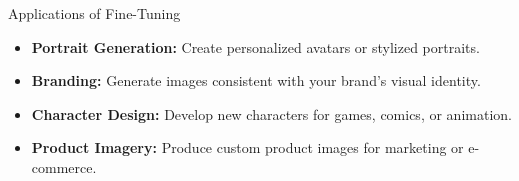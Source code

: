 


\begin{frame}[allowframebreaks]{Applications of Fine-Tuning}
\begin{itemize}
    \item \textbf{Portrait Generation:} Create personalized avatars or stylized portraits.
    \item \textbf{Branding:} Generate images consistent with your brand's visual identity.
    \item \textbf{Character Design:} Develop new characters for games, comics, or animation.
    \item \textbf{Product Imagery:} Produce custom product images for marketing or e-commerce.
\end{itemize}
\end{frame}
